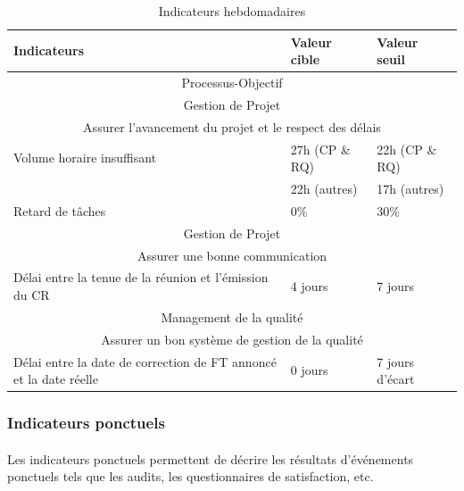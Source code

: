 \begin{table}[H]
\begin{tabular}[h]{|p{}|p{}|p{}|}
	\hline
	\rowcolor[gray]{0.85}
	Indicateurs & Valeur cible & Valeur seuil \\\hline
	\multicolumn{3}{|c|}{Processus-Objectif} \\\hline
	\multicolumn{3}{|c|}{\cellcolor[gray]{0.85} Gestion de Projet} \\
	\multicolumn{3}{|c|}{\cellcolor[gray]{0.85} Assurer l'avancement du projet et le respect des délais} \\\hline
	Volume horaire insuffisant & 27h (CP \& RQ) & 22h (CP \& RQ)  \\
	 & 22h (autres) & 17h (autres)  \\\hline
	Retard de tâches & 0\% & 30\% \\\hline
	\multicolumn{3}{|c|}{\cellcolor[gray]{0.85} Gestion de Projet} \\
	\multicolumn{3}{|c|}{\cellcolor[gray]{0.85} Assurer une bonne communication} \\\hline
	Délai entre la tenue de la réunion et l'émission du CR & 4 jours & 7 jours \\\hline
	\multicolumn{3}{|c|}{\cellcolor[gray]{0.85} Management de la qualité} \\
	\multicolumn{3}{|c|}{\cellcolor[gray]{0.85} Assurer un bon système de gestion de la qualité} \\\hline
	Délai entre la date de correction de FT annoncé et la date réelle & 0 jours & 7 jours d'écart \\\hline
	
\end{tabular}
\caption{Indicateurs hebdomadaires} \label{Tableau 6.1}
\end{table}

\subsubsection*{Indicateurs ponctuels}
\label{Indicateurs ponctuels}
\paragraph*{} Les indicateurs ponctuels permettent de décrire les résultats d’événements ponctuels tels que les audits, les questionnaires de satisfaction, etc.

